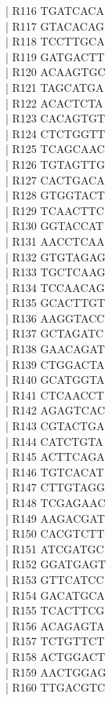 \documentclass[titlepage,10pt,a4paper,uplatex]{jsbook}
\newenvironment{content}{\begin{shaded}\vspace{-1em}\raggedright\ttfamily\footnotesize\setlength{\baselineskip}{1.4em}}{\end{shaded}\vspace{-1em}}
\begin{document}
\begin{content}
| R116	TGATCACA\\
| R117	GTACACAG\\
| R118	TCCTTGCA\\
| R119	GATGACTT\\
| R120	ACAAGTGC\\
| R121	TAGCATGA\\
| R122	ACACTCTA\\
| R123	CACAGTGT\\
| R124	CTCTGGTT\\
| R125	TCAGCAAC\\
| R126	TGTAGTTG\\
| R127	CACTGACA\\
| R128	GTGGTACT\\
| R129	TCAACTTC\\
| R130	GGTACCAT\\
| R131	AACCTCAA\\
| R132	GTGTAGAG\\
| R133	TGCTCAAG\\
| R134	TCCAACAG\\
| R135	GCACTTGT\\
| R136	AAGGTACC\\
| R137	GCTAGATC\\
| R138	GAACAGAT\\
| R139	CTGGACTA\\
| R140	GCATGGTA\\
| R141	CTCAACCT\\
| R142	AGAGTCAC\\
| R143	CGTACTGA\\
| R144	CATCTGTA\\
| R145	ACTTCAGA\\
| R146	TGTCACAT\\
| R147	CTTGTAGG\\
| R148	TCGAGAAC\\
| R149	AAGACGAT\\
| R150	CACGTCTT\\
| R151	ATCGATGC\\
| R152	GGATGAGT\\
| R153	GTTCATCC\\
| R154	GACATGCA\\
| R155	TCACTTCG\\
| R156	ACAGAGTA\\
| R157	TCTGTTCT\\
| R158	ACTGGACT\\
| R159	AACTGGAG\\
| R160	TTGACGTC\\

\end{content}
\end{document}
